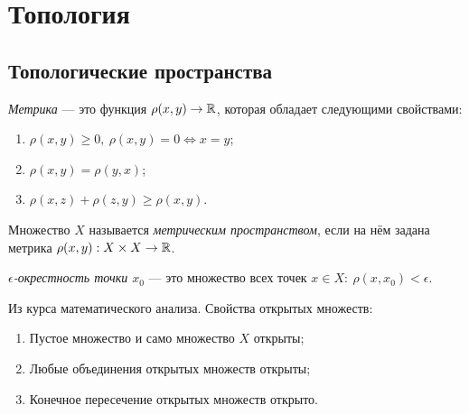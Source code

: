 \chapter{Топология}
\section{Топологические пространства}
\begin{definition}
    \textit{Метрика} — это функция $\rho(x,y) \to \mathbb{R}$, которая обладает следующими свойствами:
    \begin{enumerate}
        \item $\rho(x,y) \geq 0, \ \rho(x,y) = 0 \Leftrightarrow x = y$;
        \item $\rho(x,y) = \rho(y,x)$;
        \item $\rho(x,z) + \rho(z,y) \geq \rho(x,y)$.
    \end{enumerate}
\end{definition}

\begin{definition}
    Множество $X$ называется \textit{метрическим пространством}, если на нём задана метрика $\rho(x,y): X \times X \to \mathbb{R}$.
\end{definition}

\begin{definition}
    \textit{$\epsilon$-окрестность точки $x_0$} — это множество всех точек $x \in X: \ \rho(x, x_0) < \epsilon$.
\end{definition}

Из курса математического анализа. Свойства открытых множеств:
\begin{enumerate}
    \item Пустое множество и само множество $X$ открыты;
    \item Любые объединения открытых множеств открыты;
    \item Конечное пересечение открытых множеств открыто.
\end{enumerate}


